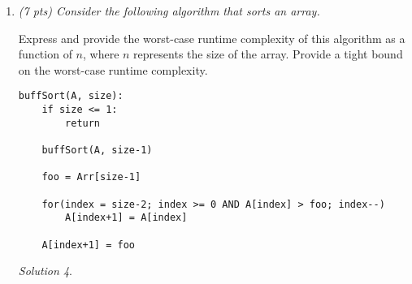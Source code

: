 \documentclass[12pt]{article}
\theoremstyle{remark}
\newtheorem*{solution}{Solution}
\newcommand{\makenonemptybox}[2]{%
\item[]
\fbox{%
\parbox[c][#1][t]{\dimexpr\linewidth-2\fboxsep-2\fboxrule}{
  \hrule width \hsize height 0pt
  #2
 }%
}%
\par\vspace{\ht\strutbox}
}
\begin{document}
\begin{enumerate}
\begin{enumerate}[label=(\alph*)]
\item (3 pts) Solve your recurrence \textbf{using the Master's Method} and get a tight bound on the worst-case runtime complexity.
\begin{solution}
\end{solution}
\pagebreak

\item (6 pts) Solve your recurrence \textbf{using the recurrence tree method} and get a tight bound on the worst-case runtime complexity. (It's ok to put an image of your hand drawn tree but label it neatly.)
\begin{solution}
\end{solution}
\pagebreak

\item (4 pts) Give a tight bound ($\Theta$ bound) on the number of {\tt return} calls this algorithm makes. Justify your answer.
\begin{solution}
\end{solution}
\pagebreak
\end{enumerate}




\pagebreak
\item {\itshape (7 pts) Consider the following algorithm that sorts an array.

\noindent Express and provide the worst-case runtime complexity of this algorithm as a function of $n$, where $n$ represents the size of the array. Provide a tight bound on the worst-case runtime complexity.
}
\begin{verbatim}
buffSort(A, size):
    if size <= 1:
        return
    
    buffSort(A, size-1)
    
    foo = Arr[size-1]
    
    for(index = size-2; index >= 0 AND A[index] > foo; index--)
        A[index+1] = A[index]
    
    A[index+1] = foo
\end{verbatim}
\begin{solution}
\end{solution}

\end{enumerate}
\end{document}
